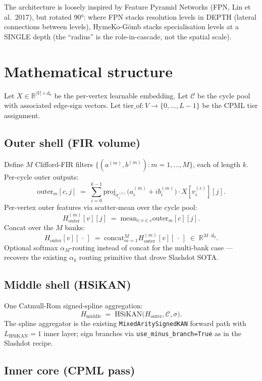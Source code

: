 \documentclass[11pt]{article}
\begin{document}
The architecture is loosely inspired by Feature Pyramid Networks
(FPN, Lin et al.\ 2017), but rotated 90°: where FPN stacks
resolution levels in DEPTH (lateral connections between levels),
HymeKo-Gömb stacks specialisation levels at a SINGLE depth (the
``radius'' is the role-in-cascade, not the spatial scale).

\section{Mathematical structure}

Let $X \in \mathbb{R}^{|V| \times d_0}$ be the per-vertex learnable
embedding. Let $\mathcal{C}$ be the cycle pool with associated
edge-sign vectors. Let $\mathrm{tier\_of} : V \to \{0, \ldots, L-1\}$
be the CPML tier assignment.

\subsection{Outer shell (FIR volume)}

Define $M$ Clifford-FIR filters
$\{(a^{(m)}, b^{(m)}) : m = 1, \ldots, M\}$, each of length $k$.
Per-cycle outer outputs:
\[
  \mathrm{outer}_m[c, j] \;=\; \sum_{i=0}^{k-1}
      \mathrm{proj}_{\sigma_i^{(c)}}\!\big(a_i^{(m)} + i b_i^{(m)}\big)
      \cdot X[v_i^{(c)}][j].
\]
Per-vertex outer features via scatter-mean over the cycle pool:
\[
  H_{\mathrm{outer}}^{(m)}[v][j] \;=\;
  \mathrm{mean}_{c: v \in c} \mathrm{outer}_m[c][j].
\]
Concat over the $M$ banks:
\[
  H_{\mathrm{outer}}[v][\,\cdot\,] \;=\;
  \mathrm{concat}_{m=1}^M H_{\mathrm{outer}}^{(m)}[v][\,\cdot\,]
  \;\in\; \mathbb{R}^{M \cdot d_0}.
\]
Optional softmax $\alpha_M$-routing instead of concat for the
multi-bank case --- recovers the existing $\alpha_k$ routing
primitive that drove Slashdot SOTA.

\subsection{Middle shell (HSiKAN)}

One Catmull-Rom signed-spline aggregation:
\[
  H_{\mathrm{middle}} \;=\;
  \mathrm{HSiKAN}\big(H_{\mathrm{outer}}, \mathcal{C}, \sigma\big).
\]
The spline aggregator is the existing
\texttt{MixedAritySignedKAN} forward path with $L_{\mathrm{HSiKAN}} = 1$
inner layer; sign branches via \texttt{use\_minus\_branch=True} as in
the Slashdot recipe.

\subsection{Inner core (CPML pass)}
\end{document}
